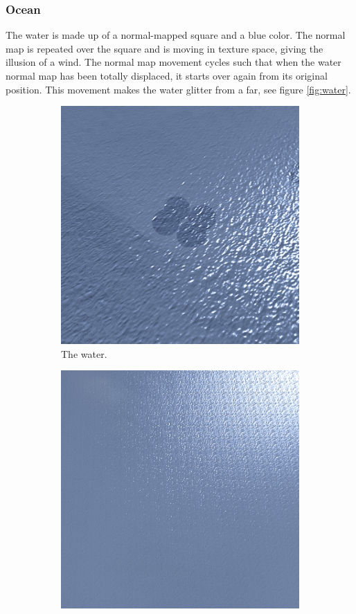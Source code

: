 \subsubsection{Ocean}
The water is made up of a normal-mapped square and a blue color. The normal map is repeated over the square and is moving in texture space, giving the illusion of a wind. The normal map movement cycles such that when the water normal map has been totally displaced, it starts over again from its original position. This movement makes the water glitter from a far, see figure \ref{fig:water}.
\begin{figure}[H]
\begin{subfigure}{.5\textwidth}
  \centering
  \includegraphics[width=0.9\linewidth]{images/waterWaves.jpg}
  \caption{The water.}
  \label{fig:waterWaves}
\end{subfigure}%
\begin{subfigure}{.5\textwidth}
  \centering
  \includegraphics[width=0.9\linewidth]{images/waterGlimmer.jpg}

\end{subfigure}
\end{figure}
